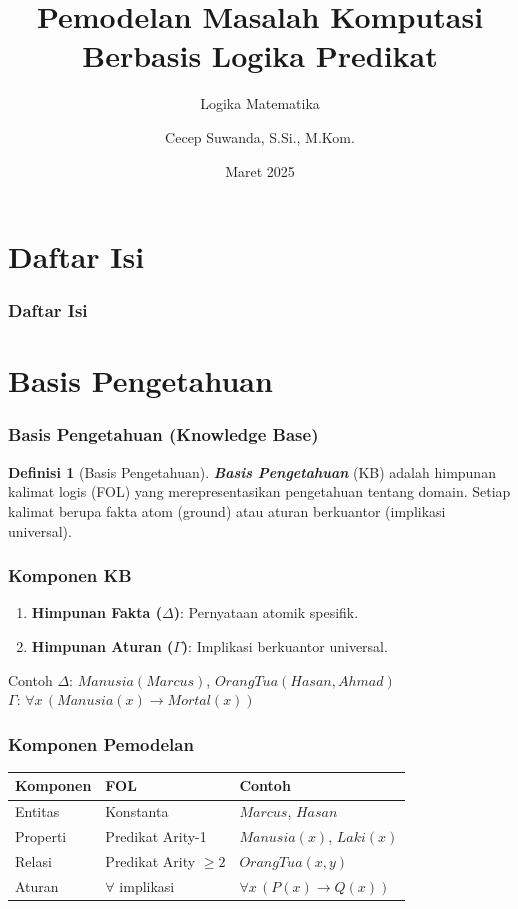 \documentclass[handout]{beamer}
\subtitle[Logika Matematika]{Logika Matematika}
\title[Pemodelan Komputasi]{Pemodelan Masalah Komputasi Berbasis Logika Predikat}
\author{Cecep Suwanda, S.Si., M.Kom.}
\date{Maret 2025}
\institute{Universitas Bale Bandung}
\newcommand{\logic}[1]{\textbf{\textit{#1}}}
\theoremstyle{definition}
\newtheorem{definisi}[theorem]{Definisi}
\theoremstyle{example}
\begin{document}
\maketitle

\section*{Daftar Isi}
\begin{frame}
\frametitle{Daftar Isi}
\tableofcontents
\end{frame}

\section{Basis Pengetahuan}

\begin{frame}
\frametitle{Basis Pengetahuan (Knowledge Base)}
\begin{definisi}[Basis Pengetahuan]
\logic{Basis Pengetahuan} (KB) adalah himpunan kalimat logis (FOL) yang merepresentasikan pengetahuan tentang domain. Setiap kalimat berupa fakta atom (ground) atau aturan berkuantor (implikasi universal).
\end{definisi}
\end{frame}

\begin{frame}
\frametitle{Komponen KB}
\begin{enumerate}
  \item \textbf{Himpunan Fakta ($\Delta$)}: Pernyataan atomik spesifik.
  \item \textbf{Himpunan Aturan ($\Gamma$)}: Implikasi berkuantor universal.
\end{enumerate}
\begin{block}{Contoh}
$\Delta$: $Manusia(Marcus)$, $OrangTua(Hasan, Ahmad)$\\
$\Gamma$: $\forall x\, (Manusia(x) \rightarrow Mortal(x))$
\end{block}
\end{frame}

\begin{frame}
\frametitle{Komponen Pemodelan}
\begin{center}
\small
\begin{tabular}{|l|l|l|}
\hline
\textbf{Komponen} & \textbf{FOL} & \textbf{Contoh} \\ \hline
Entitas & Konstanta & $Marcus$, $Hasan$ \\ \hline
Properti & Predikat Arity-1 & $Manusia(x)$, $Laki(x)$ \\ \hline
Relasi & Predikat Arity $\geq 2$ & $OrangTua(x,y)$ \\ \hline
Aturan & $\forall$ implikasi & $\forall x\, (P(x) \rightarrow Q(x))$ \\ \hline
\end{tabular}
\end{center}
\end{frame}
\end{document}
